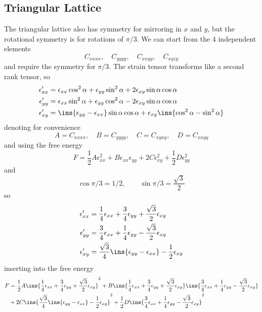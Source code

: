 \subsection{Triangular Lattice}
The triangular lattice also has symmetry for mirroring in \(x\) and \(y\), but the rotational symmetry is for rotations of \(\pi/3\). We can start from the 4 independent elements
\begin{equation}
C_{xxxx},\quad C_{yyyy},\quad C_{xxyy},\quad C_{xyzy}    
\end{equation}
and require the symmetry for \(\pi/3\). The strain tensor transforms like a second rank tensor, so 
\begin{align}
    \epsilon'_{xx}&=\epsilon_{xx}\cos^2\alpha+\epsilon_{yy}\sin^2\alpha+2\epsilon_{xy}\sin\alpha\cos\alpha\\
    \epsilon'_{yy}&=\epsilon_{xx}\sin^2\alpha+\epsilon_{yy}\cos^2\alpha-2\epsilon_{xy}\sin\alpha\cos\alpha\\
    \epsilon'_{xy}&=\ins{\epsilon_{yy}-\epsilon_{xx}}\sin\alpha\cos\alpha+\epsilon_{xy}\ins{\cos^2\alpha-\sin^2\alpha}
\end{align}
denoting for convenience
\begin{equation}
    A=C_{xxxx},\quad B=C_{yyyy},\quad C=C_{xyxy},\quad D=C_{xxyy}
\end{equation}
and using the free energy 
\begin{equation}
    F = \frac{1}{2}A\epsilon_{xx}^2+B\epsilon_{xx}\epsilon_{yy}+2C\epsilon_{xy}^2+\frac{1}{2}D\epsilon_{yy}^2
\end{equation}
and 
\begin{equation}
    \cos\pi/3=1/2,\qquad \sin\pi/3=\frac{\sqrt{3}}{2}
\end{equation}
so 
\begin{align}
    \epsilon'_{xx}&=\frac{1}{4}\epsilon_{xx}+\frac{3}{4}\epsilon_{yy}+\frac{\sqrt{3}}{2}\epsilon_{xy}\\
    \epsilon'_{yy}&=\frac{3}{4}\epsilon_{xx}+\frac{1}{4}\epsilon_{yy}-\frac{\sqrt{3}}{2}\epsilon_{xy}\\
    \epsilon'_{xy}&=\frac{\sqrt{3}}{4}\ins{\epsilon_{yy}-\epsilon_{xx}}-\frac{1}{2}\epsilon_{xy}
\end{align}
inserting into the free energy 
\begin{align}
    F &= \frac{1}{2}A\ins{\frac{1}{4}\epsilon_{xx}+\frac{3}{4}\epsilon_{yy}+\frac{\sqrt{3}}{2}\epsilon_{xy}}^2+B\ins{\frac{1}{4}\epsilon_{xx}+\frac{3}{4}\epsilon_{yy}+\frac{\sqrt{3}}{2}\epsilon_{xy}}\ins{\frac{3}{4}\epsilon_{xx}+\frac{1}{4}\epsilon_{yy}-\frac{\sqrt{3}}{2}\epsilon_{xy}}\\&+2C\ins{\frac{\sqrt{3}}{4}\ins{\epsilon_{yy}-\epsilon_{xx}}-\frac{1}{2}\epsilon_{xy}}^2+\frac{1}{2}D\ins{\frac{3}{4}\epsilon_{xx}+\frac{1}{4}\epsilon_{yy}-\frac{\sqrt{3}}{2}\epsilon_{xy}}^2
\end{align}
